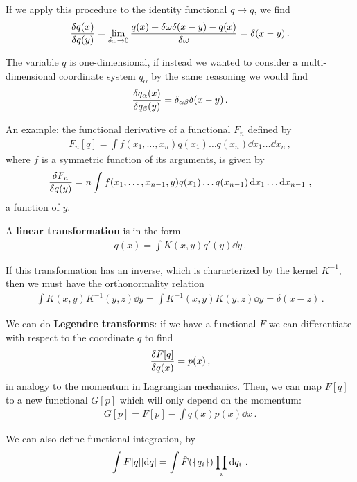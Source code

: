 \documentclass[main.tex]{subfiles}
\begin{document}
If we apply this procedure to the identity functional \(q \to q\), we find 
%
\begin{align}
\fdv{q(x)}{q(y)} = \lim_{ \delta \omega  \to 0} \frac{q (x) + \delta \omega \delta (x-y) -q (x)}{ \delta \omega } = \delta (x-y)
\,.
\end{align}

The variable \(q\) is one-dimensional, if instead we wanted to consider a multi-dimensional coordinate system \(q_\alpha \) by the same reasoning we would find 
%
\begin{align}
\fdv{q_\alpha (x)}{q_\beta (y)} = \delta_{\alpha \beta } \delta (x-y)
\,.
\end{align}

An example: the functional derivative of a functional \(F_n\) defined by 
%
\begin{align}
F_n[q] = \int f(x_1 , \dots, x_n) q(x_1 )\dots q(x_n) \dd{x_1} \dots \dd{x_n}
\,,
\end{align}
%
where \(f\) is a symmetric function of its arguments, is given by 
%
\begin{align}
\fdv{F_n}{q(y)} = n \int f(x_1, \dots, x_{n-1}, y) q(x_1 )\dots q(x_{n-1}) \dd{x_1 } \dots \dd{x_{n-1}}
\,,
\end{align}
%
a function of \(y\). 

A \textbf{linear transformation} is in the form 
%
\begin{align}
q(x) = \int K(x, y) q'(y) \dd{y}
\,.
\end{align}

If this transformation has an inverse, which is characterized by the kernel \(K^{-1}\), then we must have the orthonormality relation 
%
\begin{align}
\int K(x,y) K^{-1} (y, z) \dd{y} =
\int K^{-1}(x,y) K (y, z) \dd{y} =
\delta (x-z)
\,.
\end{align}

We can do \textbf{Legendre transforms}: if we have a functional \(F\) we can differentiate with respect to the coordinate \(q\) to find 
%
\begin{align}
\fdv{F[q]}{q(x)} = p(x)
\,,
\end{align}
%
in analogy to the momentum in Lagrangian mechanics. Then, we can map \(F[q]\) to a new functional \(G[p]\) which will only depend on the momentum: 
%
\begin{align}
G[p]= F[p] - \int q(x) p(x) \dd{x}
\,.
\end{align}

We can also define functional integration, by 
%
\begin{align}
\int F[q] \qty[ \dd{q}] = \int \hat{F}(\qty{q_i}) \prod_i \dd{q_i}
\,.
\end{align}
\end{document}
